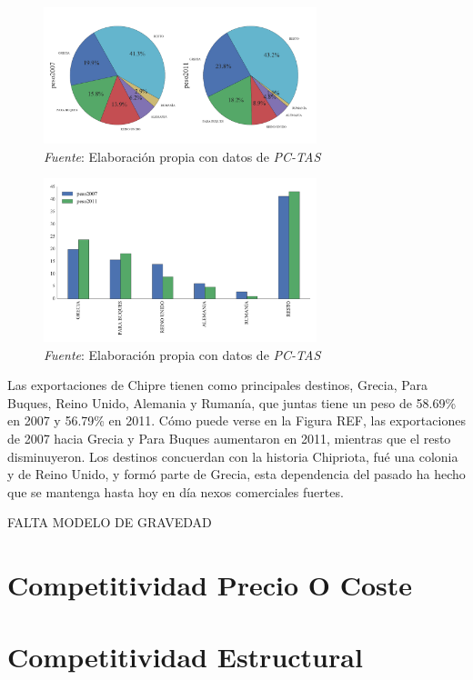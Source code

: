 \documentclass[a4paper,openright,12pt]{book}
\begin{document}
\begin{figure}[!ht]
    \centering
    \caption{}
    \includegraphics[width=300px]{pie_xgeo.pdf}
    \caption*{\textit{Fuente}: Elaboración propia con datos de \textit{PC-TAS}}
    \label{}
\end{figure}

\begin{figure}[!ht]
    \centering
    \caption{}
    \includegraphics[width=300px]{bar_xgeo.pdf}
    \caption*{\textit{Fuente}: Elaboración propia con datos de \textit{PC-TAS}}
    \label{}
\end{figure}


Las exportaciones de Chipre tienen como principales destinos, Grecia, Para Buques, Reino Unido, Alemania y Rumanía, que juntas tiene un peso de 58.69\% en 2007 y 56.79\% en 2011. Cómo puede verse en la Figura REF, las exportaciones de 2007 hacia Grecia y Para Buques aumentaron en 2011, mientras que el resto disminuyeron.
Los destinos concuerdan con la historia Chipriota, fué una colonia y de Reino Unido, y formó parte de Grecia, esta dependencia del pasado ha hecho que se mantenga hasta hoy en día nexos comerciales fuertes.

FALTA MODELO DE GRAVEDAD


\chapter{Competitividad Precio O Coste}
\label{cap4}

\chapter{Competitividad Estructural}
\label{cap5}
\end{document}
